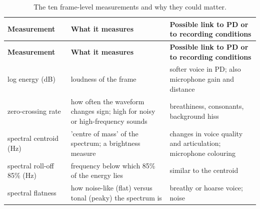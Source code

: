 \documentclass[11pt,a4paper]{article}
\begin{document}
\begin{center}\small\renewcommand{\arraystretch}{1.15}
\begin{longtable}{>{\raggedright\arraybackslash}p{3.32cm}>{\raggedright\arraybackslash}p{5.86cm}>{\raggedright\arraybackslash}p{6.06cm}}
\caption{The ten frame-level measurements and why they could matter.}\\
\toprule
\textbf{\hspace{0pt}Measurement} & \textbf{\hspace{0pt}What it measures} & \textbf{\hspace{0pt}Possible link to PD or to recording conditions}\\\midrule\endfirsthead
\toprule
\textbf{\hspace{0pt}Measurement} & \textbf{\hspace{0pt}What it measures} & \textbf{\hspace{0pt}Possible link to PD or to recording conditions}\\\midrule\endhead
\bottomrule\endfoot
\hspace{0pt}log energy (dB) & \hspace{0pt}loudness of the frame & \hspace{0pt}softer voice in PD; also microphone gain and distance\\
\hspace{0pt}zero-crossing rate & \hspace{0pt}how often the waveform changes sign; high for noisy or high-frequency sounds & \hspace{0pt}breathiness, consonants, background hiss\\
\hspace{0pt}spectral centroid (Hz) & \hspace{0pt}'centre of mass' of the spectrum; a brightness measure & \hspace{0pt}changes in voice quality and articulation; microphone colouring\\
\hspace{0pt}spectral roll-off 85\% (Hz) & \hspace{0pt}frequency below which 85\% of the energy lies & \hspace{0pt}similar to the centroid\\
\hspace{0pt}spectral flatness & \hspace{0pt}how noise-like (flat) versus tonal (peaky) the spectrum is & \hspace{0pt}breathy or hoarse voice; noise\\

\end{longtable}
\end{center}
\end{document}
